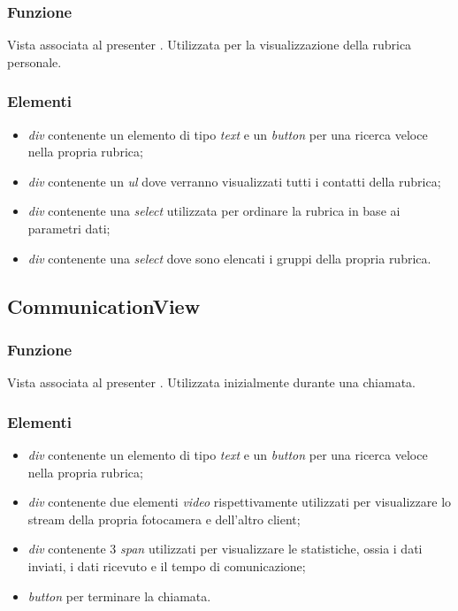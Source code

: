 \subsubsection*{Funzione}
Vista associata al presenter . Utilizzata per la visualizzazione della rubrica personale.

\subsubsection*{Elementi}
\begin{itemize}
\item \textit{div} contenente un elemento di tipo \textit{text} e un \textit{button} per una ricerca veloce nella propria rubrica;
\item \textit{div} contenente un \textit{ul} dove verranno visualizzati tutti i contatti della rubrica;
\item \textit{div} contenente una \textit{select} utilizzata per ordinare la rubrica in base ai parametri dati;
\item \textit{div} contenente una \textit{select} dove sono elencati i gruppi della propria rubrica.
\end{itemize}

\subsection{CommunicationView}
\subsubsection*{Funzione}
Vista associata al presenter . Utilizzata inizialmente durante una chiamata.

\subsubsection*{Elementi}
\begin{itemize}
\item \textit{div} contenente un elemento di tipo \textit{text} e un \textit{button} per una ricerca veloce nella propria rubrica;
\item \textit{div} contenente due elementi \textit{video} rispettivamente utilizzati per visualizzare lo stream della propria fotocamera e dell'altro client;
\item \textit{div} contenente 3 \textit{span} utilizzati per visualizzare le statistiche, ossia i dati inviati, i dati ricevuto e il tempo di comunicazione;
\item \textit{button} per terminare la chiamata.
\end{itemize}

